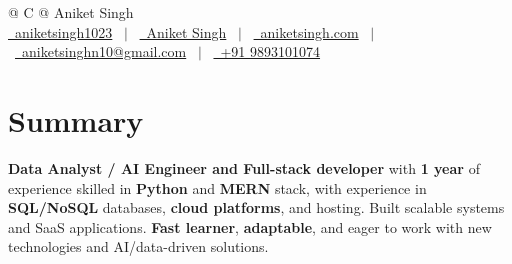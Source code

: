 \documentclass[a4paper,12pt]{article}
\begin{document}
\pagestyle{empty} 



\begin{tabularx}{\linewidth}{@{} C @{}}
\Huge{Aniket Singh} \\[7.5pt]
\href{https://github.com/aniketsingh1023}{\raisebox{-0.05\height}\faGithub\ aniketsingh1023} \ $|$ \ 
\href{https://www.linkedin.com/in/aniket-singh-994b34274}{\raisebox{-0.05\height}\faLinkedin\ Aniket Singh} \ $|$ \ 
\href{https://aniket-portfolio-2024.vercel.app/}{\raisebox{-0.05\height}\faGlobe \ aniketsingh.com} \ $|$ \ 
\href{mailto:aniketsinghn10@gmail.com}{\raisebox{-0.05\height}\faEnvelope \ aniketsinghn10@gmail.com} \ $|$ \ 
\href{tel:+919893101074}{\raisebox{-0.05\height}\faMobile \ +91 9893101074} \\
\end{tabularx}


\section{Summary}
\textbf{Data Analyst / AI Engineer and Full-stack developer} with \textbf{1 year} of experience skilled in \textbf{Python }and \textbf{MERN} stack, with experience in \textbf{SQL/NoSQL} databases,\textbf{ cloud platforms}, and hosting. Built scalable systems and SaaS applications. \textbf{Fast learner},\textbf{ adaptable}, and eager to work with new technologies and AI/data-driven solutions. 

\end{document}
